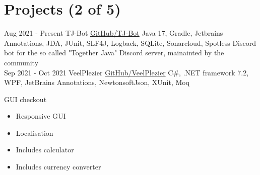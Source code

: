 \documentclass[letterpaper]{twentysecondcv} %
\begin{document}

\section{Projects (2 of 5)}
\begin{twenty} %
	\twentyitem
    		{Aug 2021 -}
		{Present}
        		{TJ-Bot}
        		{\href{https://github.com/Together-Java/TJ-Bot/}{GitHub/TJ-Bot}}
        		{Java 17, Gradle, Jetbrains Annotations, JDA, JUnit, SLF4J, Logback, SQLite, Sonarcloud, Spotless}
        		{Discord bot for the so called "Together Java" Discord server, mainainted by the community}\\
	\twentyitem
    		{Sep 2021 -}
		{Oct 2021}
        		{VeelPlezier}
        		{\href{https://github.com/Tais993/VeelPlezier}{GitHub/VeelPlezier}}
        		{C\#, .NET framework 7.2, WPF, JetBrains Annotations, NewtonsoftJson, XUnit, Moq}
        		{
        		GUI checkout
        		\begin{itemize}
        			\item Responsive GUI
        			\item Localisation
        			\item Includes calculator
        			\item Includes currency converter
        		\end{itemize}}\\
\end{twenty}

\newpage

\makesidebarSecond %

\end{document}
